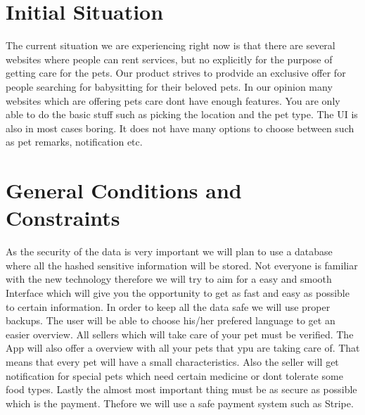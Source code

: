 \documentclass[12pt]{article}
\theoremstyle{definition}
\newenvironment{explanation}{%
}{}
\begin{document}
\section{Initial Situation}
\begin{explanation}
The current situation we are experiencing right now is that there are several websites where people can rent services, but no explicitly for the purpose of getting care for the pets.
Our product strives to prodvide an exclusive offer for people searching for babysitting for their beloved pets. In our opinion many websites
which are offering pets care dont have enough features. You are only able to do the basic stuff such as picking the location and the pet type. 
The UI is also in most cases boring. It does not have many options to choose between such as pet remarks, notification etc. 
\end{explanation}

\section{General Conditions and Constraints}
As the security of the data is very important we will plan to use a database where all the hashed sensitive information will be stored.
\newline
Not everyone is familiar with the new technology therefore we will try to aim for a easy and smooth Interface which will give you the opportunity
to get as fast and easy as possible to certain information.
\newline
In order to keep all the data safe we will use proper backups. The user will be able to choose his/her prefered language to get an easier overview.
\newline
All sellers which will take care of your pet must be verified.
\newline
The App will also offer a overview with all your pets that ypu are taking care of. That means that every pet will have a small characteristics. 
Also the seller will get notification for special pets which need certain medicine or dont tolerate some food types. 
\newline
Lastly the almost most important thing must be as secure as possible which is the payment. Thefore we will use a safe payment system such as Stripe. 
\pagebreak
\end{document}
